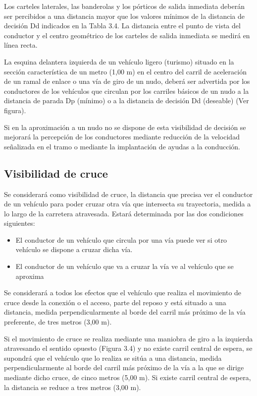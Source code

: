 \documentclass[letterpaper,10pt,english]{sphinxmanual}
\let\sphinxpxdimen\pdfpxdimen\else\newdimen\sphinxpxdimen
\begin{document}
Los carteles laterales, las banderolas y los pórticos de salida inmediata deberán ser percibidos a una distancia mayor que los valores mínimos de la distancia de decisión Dd indicados en la Tabla 3.4. La distancia entre el punto de vista del conductor y el centro geométrico de los carteles de salida inmediata se medirá en línea recta.

La esquina delantera izquierda de un vehículo ligero (turismo) situado en la sección característica de un metro (1,00 m) en el centro del carril de aceleración de un ramal de enlace o una vía de giro de un nudo, deberá ser advertida por los conductores de los vehículos que circulan por los carriles básicos de un nudo a la distancia de parada Dp (mínimo) o a la distancia de decisión Dd (deseable) (Ver figura).

Si en la aproximación a un nudo no se dispone de esta visibilidad de decisión se mejorará la percepción de los conductores mediante reducción de la velocidad señalizada en el tramo o mediante la implantación de ayudas a la conducción.

\noindent\sphinxincludegraphics[width=800\sphinxpxdimen]{{distdecision_2}.png}


\subsection{Visibilidad de cruce}
\label{\detokenize{controles:visibilidad-de-cruce}}
Se considerará como visibilidad de cruce, la distancia que precisa ver el conductor de un vehículo para poder cruzar otra vía que intersecta su trayectoria, medida a lo largo de la carretera atravesada. Estará determinada por las dos condiciones siguientes:
\begin{itemize}
\item {} 
El conductor de un vehículo que circula por una vía puede ver si otro vehículo se dispone a cruzar dicha vía.

\item {} 
El conductor de un vehículo que va a cruzar la vía ve al vehículo que se aproxima

\end{itemize}

Se considerará a todos los efectos que el vehículo que realiza el movimiento de cruce desde la conexión o el acceso, parte del reposo y está situado a una distancia, medida perpendicularmente al borde del carril más próximo de la vía preferente, de tres metros (3,00 m).

Si el movimiento de cruce se realiza mediante una maniobra de giro a la izquierda atravesando el sentido opuesto (Figura 3.4) y no existe carril central de espera, se supondrá que el vehículo que lo realiza se sitúa a una distancia, medida perpendicularmente al borde del carril más próximo de la vía a la que se dirige mediante dicho cruce, de cinco metros (5,00 m). Si existe carril central de espera, la distancia se reduce a tres metros (3,00 m).
\end{document}

